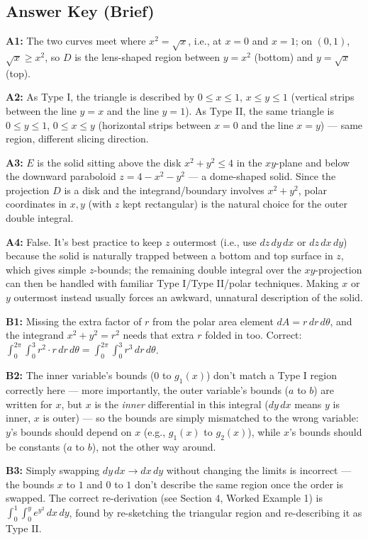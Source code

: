 \documentclass[11pt]{article}
\begin{document}
\subsection*{Answer Key (Brief)}

\textbf{A1:} The two curves meet where $x^2=\sqrt{x}$, i.e., at $x=0$ and $x=1$; on $(0,1)$, $\sqrt{x}\ge x^2$, so $D$ is the lens-shaped region between $y=x^2$ (bottom) and $y=\sqrt{x}$ (top).

\textbf{A2:} As Type I, the triangle is described by $0\le x\le1$, $x\le y\le1$ (vertical strips between the line $y=x$ and the line $y=1$). As Type II, the same triangle is $0\le y\le1$, $0\le x\le y$ (horizontal strips between $x=0$ and the line $x=y$) --- same region, different slicing direction.

\textbf{A3:} $E$ is the solid sitting above the disk $x^2+y^2\le4$ in the $xy$-plane and below the downward paraboloid $z=4-x^2-y^2$ --- a dome-shaped solid. Since the projection $D$ is a disk and the integrand/boundary involves $x^2+y^2$, polar coordinates in $x,y$ (with $z$ kept rectangular) is the natural choice for the outer double integral.

\textbf{A4:} False. It's best practice to keep $z$ outermost (i.e., use $dz\,dy\,dx$ or $dz\,dx\,dy$) because the solid is naturally trapped between a bottom and top surface in $z$, which gives simple $z$-bounds; the remaining double integral over the $xy$-projection can then be handled with familiar Type I/Type II/polar techniques. Making $x$ or $y$ outermost instead usually forces an awkward, unnatural description of the solid.

\textbf{B1:} Missing the extra factor of $r$ from the polar area element $dA=r\,dr\,d\theta$, and the integrand $x^2+y^2=r^2$ needs that extra $r$ folded in too. Correct: $\displaystyle\int_0^{2\pi}\int_0^3 r^2\cdot r\, dr\, d\theta = \int_0^{2\pi}\int_0^3 r^3\, dr\, d\theta$.

\textbf{B2:} The inner variable's bounds ($0$ to $g_1(x)$) don't match a Type I region correctly here --- more importantly, the outer variable's bounds ($a$ to $b$) are written for $x$, but $x$ is the \emph{inner} differential in this integral ($dy\,dx$ means $y$ is inner, $x$ is outer) --- so the bounds are simply mismatched to the wrong variable: $y$'s bounds should depend on $x$ (e.g., $g_1(x)$ to $g_2(x)$), while $x$'s bounds should be constants ($a$ to $b$), not the other way around.

\textbf{B3:} Simply swapping $dy\,dx\to dx\,dy$ without changing the limits is incorrect --- the bounds $x$ to $1$ and $0$ to $1$ don't describe the same region once the order is swapped. The correct re-derivation (see Section 4, Worked Example 1) is $\displaystyle\int_0^1\int_0^y e^{y^2}\, dx\, dy$, found by re-sketching the triangular region and re-describing it as Type II.
\end{document}
